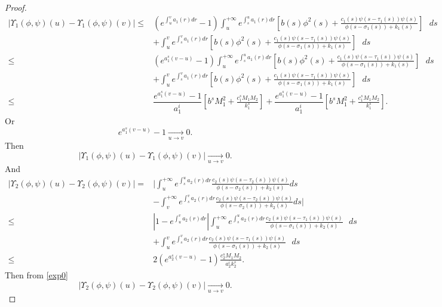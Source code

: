 \documentclass[[a4paper,10pt]{article}
\begin{document}
\begin{proof}
\begin{align*}
\bigg|\Upsilon_1(\phi,\psi)(u)-\Upsilon_1(\phi,\psi)(v)\bigg|\leq&\left(e^{\int^v_u a_1(r)dr}-1\right){\displaystyle{\int_u^{+\infty} e^{\int^u_s a_1(r)dr}}}\left[b(s) \phi^2(s)+\frac{c_1(s)\psi(s-\tau_1(s))\psi(s)}{\phi(s-\sigma_1(s))+k_1(s)}\right]\text{ } ds\\
&{\displaystyle{+\int_{u}^v e^{\int^v_s a_1(r)dr}}}\left[b(s) \phi^2(s)+\frac{c_1(s)\psi(s-\tau_1(s))\psi(s)}{\phi(s-\sigma_1(s))+k_1(s)}\right]\text{ } ds\\
\leq&\left(e^{a_1^s(v-u)}-1\right){\displaystyle{\int_u^{+\infty} e^{\int^u_s a_1(r)dr}}}\left[b(s) \phi^2(s)+\frac{c_1(s)\psi(s-\tau_1(s))\psi(s)}{\phi(s-\sigma_1(s))+k_1(s)}\right]\text{ } ds\\
&{\displaystyle{+\int_{u}^v e^{\int^v_s a_1(r)dr}}}\left[b(s)\phi^2(s)+\frac{c_1(s)\psi(s-\tau_1(s))\psi(s)}{\phi(s-\sigma_1(s))+k_1(s)}\right]\text{ } ds\\
\leq&\dfrac{e^{a_1^s(v-u)}-1}{a^i_1}\left[b^s M_1^2+\frac{c_1^sM_1M_2}{k_1^s}\right]+\dfrac{e^{a_1^s(v-u)}-1}{a^i_1}\left[b^sM_1^2+\frac{c_1^sM_1M_2}{k_1^s}\right].
\end{align*}
 Or \begin{equation}\label{exp0}
 e^{a_1^s(v-u)}-1\underset{u\rightarrow v}{\rightarrow}0.
 \end{equation} Then
 $$\bigg|\Upsilon_1(\phi,\psi)(u)-\Upsilon_1(\phi,\psi)(v)\bigg|\underset{u\rightarrow v}{\rightarrow}0.$$
 And
\begin{align*}\left|\Upsilon_2(\phi,\psi)(u)-\Upsilon_2(\phi,\psi)(v)\right|=&\bigg|{\displaystyle{\int_u^{+\infty} e^{\int^u_s a_2(r)dr}}}\frac{c_2(s)\psi(s-\tau_2(s))\psi(s)}{\phi(s-\sigma_2(s))+k_2(s)}ds\\&{\displaystyle{-\int_v^{+\infty} e^{\int^v_s a_2(r)dr}}}\frac{c_2(s)\psi(s-\tau_2(s))\psi(s)}{\phi(s-\sigma_2(s))+k_2(s)}ds\bigg|\\
\leq&\left|1-e^{\int^v_u a_2(r)dr}\right|{\displaystyle{\int_u^{+\infty} e^{\int^u_s a_2(r)dr}}}\frac{c_2(s)\psi(s-\tau_1(s))\psi(s)}{\phi(s-\sigma_1(s))+k_2(s)}\text{ } ds\\
&{\displaystyle{+\int_{u}^v e^{\int^v_s a_2(r)dr}}}\frac{c_2(s)\psi(s-\tau_1(s))\psi(s)}{\phi(s-\sigma_1(s))+k_2(s)}\text{ } ds\\
\leq&2\left(e^{a_2^s(v-u)}-1\right)
\frac{c_2^sM_1M_2}{a^i_2k_2^s}.
\end{align*}
Then from \ref{exp0}
 $$\left|\Upsilon_2(\phi,\psi)(u)-\Upsilon_2(\phi,\psi)(v)\right|\underset{u\rightarrow v}{\rightarrow}0.$$

\end{proof}
\end{document}
